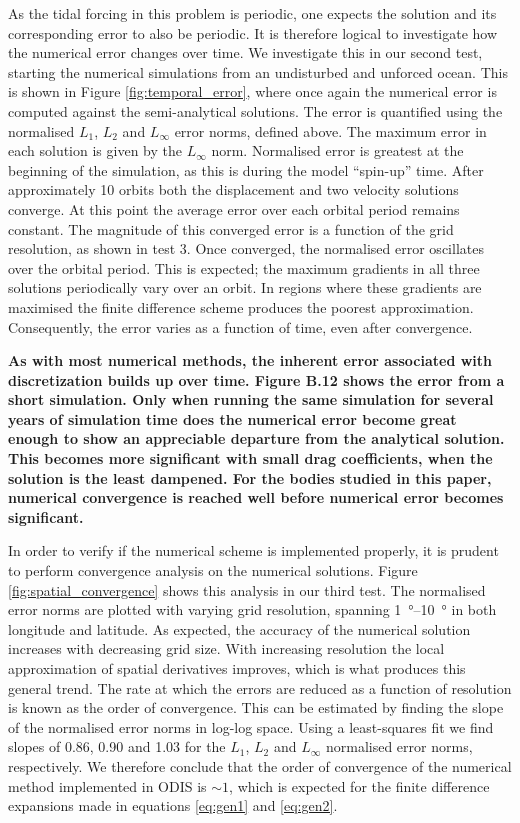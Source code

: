 As the tidal forcing in this problem is periodic, one expects the solution and its corresponding error to also be periodic. It is therefore logical to investigate how the numerical error changes over time. We investigate this in our second test, starting the numerical simulations from an undisturbed and unforced ocean. This is shown in Figure \ref{fig:temporal_error}, where once again the numerical error is computed against the \citet{matsuyama2014tidal} semi-analytical solutions. The error is quantified using the normalised $L_1$, $L_2$ and $L_{\infty}$ error norms, defined above. The maximum error in each solution is given by the $L_{\infty}$ norm. Normalised error is greatest at the beginning of the simulation, as this is during the model ``spin-up'' time. After approximately \num{10} orbits both the displacement and two velocity solutions converge. At this point the average error over each orbital period remains constant. The magnitude of this converged error is a function of the grid resolution, as shown in test 3. Once converged, the normalised error oscillates over the orbital period. This is expected; the maximum gradients in all three solutions periodically vary over an orbit. In regions where these gradients are maximised the finite difference scheme produces the poorest approximation. Consequently, the error varies as a function of time, even after convergence. 

\textbf{As with most numerical methods, the inherent error associated with discretization builds up over time. Figure B.12 shows the error from a short simulation. Only when running the same simulation for several years of simulation time does the numerical error become great enough to show an appreciable departure from the analytical solution. This becomes more significant with small drag coefficients, when the solution is the least dampened. For the bodies studied in this paper, numerical convergence is reached well before numerical error becomes significant.}

In order to verify if the numerical scheme is implemented properly, it is prudent to perform convergence analysis on the numerical solutions. Figure \ref{fig:spatial_convergence} shows this analysis in our third test. The normalised error norms are plotted with varying grid resolution, spanning \SIrange{1}{10}{\degree} in both longitude and latitude. As expected, the accuracy of the numerical solution increases with decreasing grid size. With increasing resolution the local approximation of spatial derivatives improves, which is what produces this general trend. The rate at which the errors are reduced as a function of resolution is known as the order of convergence. This can be estimated by finding the slope of the normalised error norms in log-log space. Using a least-squares fit we find slopes of \num{0.86}, \num{0.90} and \num{1.03} for the $L_1$, $L_2$ and $L_{\infty}$ normalised error norms, respectively. We therefore conclude that the order of convergence of the numerical method implemented in ODIS is $\sim 1$, which is expected for the finite difference expansions made in equations \ref{eq:gen1} and \ref{eq:gen2}.

